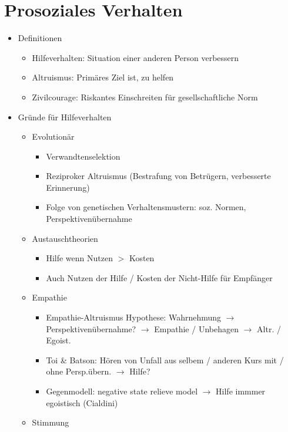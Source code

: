 \documentclass[11pt, paper=a4, twocolumn]{scrartcl}
\begin{document}
	\section{Prosoziales Verhalten}
		\begin{itemize}
			\item Definitionen
				\begin{itemize}
					\item Hilfeverhalten: Situation einer anderen Person verbessern
					\item Altruismus: Primäres Ziel ist, zu helfen
					\item Zivilcourage: Riskantes Einschreiten für gesellschaftliche Norm
				\end{itemize}
			\item Gründe für Hilfeverhalten
				\begin{itemize}
					\item Evolutionär
						\begin{itemize}
							\item Verwandtenselektion
							\item Reziproker Altruismus (Bestrafung von Betrügern, verbesserte Erinnerung)
							\item Folge von genetischen Verhaltensmustern: soz. Normen, Perspektivenübernahme
						\end{itemize}
					\item Austauschtheorien
						\begin{itemize}
							\item Hilfe wenn Nutzen $>$ Kosten
							\item Auch Nutzen der Hilfe / Kosten der Nicht-Hilfe für Empfänger
						\end{itemize}
					\item Empathie
						\begin{itemize}
							\item Empathie-Altruismus Hypothese: Wahrnehmung $\rightarrow$ Perspektivenübernahme? 
								$\rightarrow$ Empathie / Unbehagen $\rightarrow$ Altr. / Egoist.
							\item Toi \& Batson: Hören von Unfall aus selbem / anderen Kurs mit / ohne Persp.übern. 
								$\rightarrow$ Hilfe?
							\item Gegenmodell: negative state relieve model $\rightarrow$ Hilfe immmer egoistisch (Cialdini)
						\end{itemize}
					\item Stimmung
						\begin{itemize}

\end{itemize}
\end{itemize}
\end{itemize}
\end{document}
